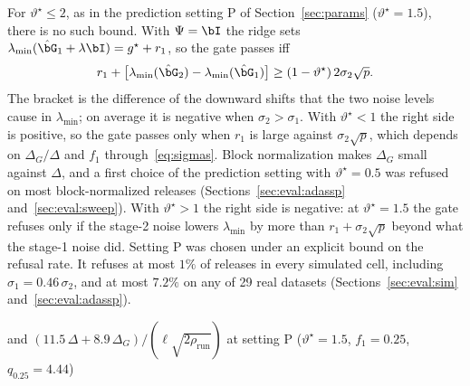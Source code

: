 For $\vartheta^\star \le 2$, as in the prediction setting P of Section~\ref{sec:params} ($\vartheta^\star = 1.5$), there is no such bound. With $\Psi = \bI$ the ridge sets $\lambda_{\min}(\hat\bG_1 + \lambda\bI) = g^\star + r_1$, so the gate passes iff
\[
  r_1 + \bigl[\lambda_{\min}(\hat\bG_2) - \lambda_{\min}(\hat\bG_1)\bigr] \ge (1 - \vartheta^\star)\, 2\sigma_2\sqrt p .
\]
The bracket is the difference of the downward shifts that the two noise levels cause in $\lambda_{\min}$; on average it is negative when $\sigma_2 > \sigma_1$. With $\vartheta^\star < 1$ the right side is positive, so the gate passes only when $r_1$ is large against $\sigma_2\sqrt p$, which depends on $\Delta_G/\Delta$ and $f_1$ through~\eqref{eq:sigmas}. Block normalization makes $\Delta_G$ small against $\Delta$, and a first choice of the prediction setting with $\vartheta^\star = 0.5$ was refused on most block-normalized releases (Sections~\ref{sec:eval:adassp} and~\ref{sec:eval:sweep}). With $\vartheta^\star > 1$ the right side is negative: at $\vartheta^\star = 1.5$ the gate refuses only if the stage-2 noise lowers $\lambda_{\min}$ by more than $r_1 + \sigma_2\sqrt p$ beyond what the stage-1 noise did. Setting P was chosen under an explicit bound on the refusal rate. It refuses at most $1\%$ of releases in every simulated cell, including $\sigma_1 = 0.46\,\sigma_2$, and at most $7.2\%$ on any of 29 real datasets (Sections~\ref{sec:eval:sim} and~\ref{sec:eval:adassp}).

and $(11.5\,\Delta + 8.9\,\Delta_G)/(\ell\sqrt{2\rho_{\mathrm{run}}})$ at setting P ($\vartheta^\star = 1.5$, $f_1 = 0.25$, $q_{0.25} = 4.44$)

